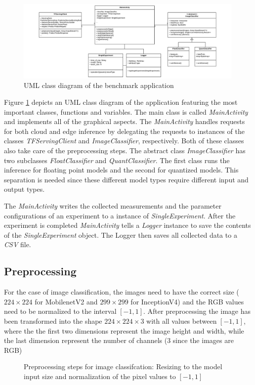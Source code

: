 \begin{figure}[htb]
\centering
\includegraphics[width=0.99\textwidth]{./Bilder/UML.pdf}
\caption{UML class diagram of the benchmark application}
\label{fig:UML}
\end{figure}
Figure \ref{fig:UML} depicts an UML class diagram of the application featuring the most important classes, functions and variables. 
The main class is called \emph{MainActivity} and implements all of the graphical aspects. 
The \emph{MainActivity} handles requests for both cloud and edge inference by delegating the requests to instances of the classes \emph{TFServingClient} and \emph{ImageClassifier}, respectively. Both of these classes also take care of the preprocessing steps.
The abstract class \emph{ImageClassifier} has two subclasses \emph{FloatClassifier} and \emph{QuantClassifier}. The first class runs the inference for floating point models and the second for quantized models.
This separation is needed since these different model types require different input and output types.

The \emph{MainActivity} writes the collected measurements and the parameter configurations of an experiment to a instance of \emph{SingleExperiment}. After the experiment is completed \emph{MainActivity} tells a \emph{Logger} instance to save the contents of the \emph{SingleExperiment} object. The Logger then saves all collected data to a \emph{CSV} file.

\subsection{Preprocessing}
For the case of image classification, the images need to have the correct size ($224\times224$ for MobilenetV2 and $299\times299$ for InceptionV4) and the RGB values need to be normalized to the interval $[-1,1]$. After preprocessing the image has been transformed into the shape $224\times224\times3$ with all values between $[-1,1]$, where the the first two dimensions represent the image height and width, while the last dimension represent the number of channels (3 since the images are RGB)
\begin{figure}[H]
\centering

\caption{Preprocessing steps for image classifcation: Resizing to the model input size and normalization of the pixel values to $[-1,1]$}
\label{fig:prepro}
\end{figure}

